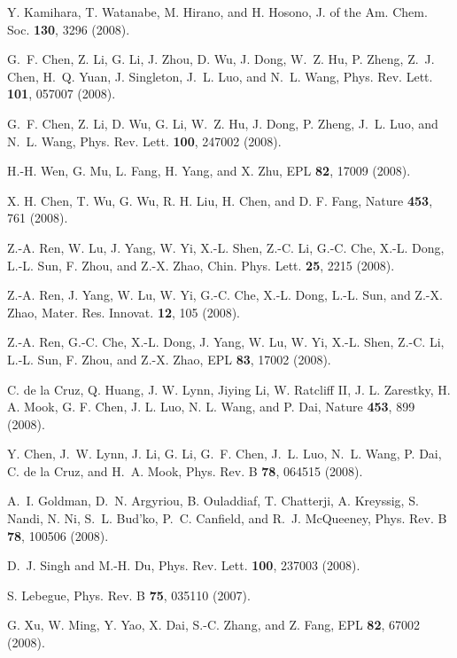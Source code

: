 \documentclass[aps,prb,superscriptaddress,preprintnumbers,
showpacs,legalpaper,twoside,twocolumn,amsmath,amssymb]{revtex4}
\begin{document}
\begin{thebibliography}{10}

Y. Kamihara, T. Watanabe, M. Hirano, and H. Hosono, J. of the Am. Chem. Soc.
  {\bf 130},  3296  (2008).

G.~F. Chen, Z. Li, G. Li, J. Zhou, D. Wu, J. Dong, W.~Z. Hu, P. Zheng, Z.~J.
  Chen, H.~Q. Yuan, J. Singleton, J.~L. Luo, and N.~L. Wang, Phys. Rev. Lett.
  {\bf 101},  057007  (2008).

G.~F. Chen, Z. Li, D. Wu, G. Li, W.~Z. Hu, J. Dong, P. Zheng, J.~L. Luo, and
  N.~L. Wang, Phys. Rev. Lett. {\bf 100},  247002  (2008).

H.-H. Wen, G. Mu, L. Fang, H. Yang, and X. Zhu, EPL {\bf 82},  17009  (2008).

{X. H. Chen}, {T. Wu}, {G. Wu}, {R. H. Liu}, {H. Chen}, and {D. F. Fang},
  Nature {\bf 453},  761  (2008).

Z.-A. Ren, W. Lu, J. Yang, W. Yi, X.-L. Shen, Z.-C. Li, G.-C. Che, X.-L. Dong,
  L.-L. Sun, F. Zhou, and Z.-X. Zhao, Chin. Phys. Lett. {\bf 25},  2215
  (2008).

Z.-A. Ren, J. Yang, W. Lu, W. Yi, G.-C. Che, X.-L. Dong, L.-L. Sun, and Z.-X.
  Zhao, Mater. Res. Innovat. {\bf 12},  105  (2008).

Z.-A. Ren, G.-C. Che, X.-L. Dong, J. Yang, W. Lu, W. Yi, X.-L. Shen, Z.-C. Li,
  L.-L. Sun, F. Zhou, and Z.-X. Zhao, EPL {\bf 83},  17002  (2008).

{C. de la Cruz}, {Q. Huang}, {J. W. Lynn}, {Jiying Li}, {W. Ratcliff II}, {J.
  L. Zarestky}, {H. A. Mook}, {G. F. Chen}, {J. L. Luo}, {N. L. Wang}, and {P.
  Dai}, Nature {\bf 453},  899  (2008).

Y. Chen, J.~W. Lynn, J. Li, G. Li, G.~F. Chen, J.~L. Luo, N.~L. Wang, P. Dai,
  C. de la Cruz, and H.~A. Mook, Phys. Rev. B {\bf 78},  064515  (2008).

A.~I. Goldman, D.~N. Argyriou, B. Ouladdiaf, T. Chatterji, A. Kreyssig, S.
  Nandi, N. Ni, S.~L. Bud'ko, P.~C. Canfield, and R.~J. McQueeney, Phys. Rev. B
  {\bf 78},  100506  (2008).

D.~J. Singh and M.-H. Du, Phys. Rev. Lett. {\bf 100},  237003  (2008).

S. Lebegue, Phys. Rev. B {\bf 75},  035110  (2007).

G. Xu, W. Ming, Y. Yao, X. Dai, S.-C. Zhang, and Z. Fang, EPL {\bf 82},  67002
  (2008).


\end{thebibliography}
\end{document}
